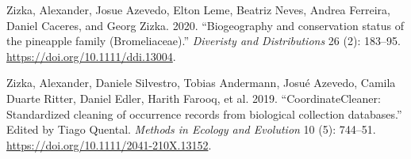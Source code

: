 \documentclass[fleqn,10pt,lineno]{wlpeerj} %
\begin{document}
\leavevmode\hypertarget{ref-Zizka2020b}{}%
Zizka, Alexander, Josue Azevedo, Elton Leme, Beatriz Neves, Andrea Ferreira, Daniel Caceres, and Georg Zizka. 2020. ``Biogeography and conservation status of the pineapple family (Bromeliaceae).'' \emph{Diveristy and Distributions} 26 (2): 183--95. \url{https://doi.org/10.1111/ddi.13004}.

\leavevmode\hypertarget{ref-Zizka2019}{}%
Zizka, Alexander, Daniele Silvestro, Tobias Andermann, Josué Azevedo, Camila Duarte Ritter, Daniel Edler, Harith Farooq, et al. 2019. ``CoordinateCleaner: Standardized cleaning of occurrence records from biological collection databases.'' Edited by Tiago Quental. \emph{Methods in Ecology and Evolution} 10 (5): 744--51. \url{https://doi.org/10.1111/2041-210X.13152}.
\end{document}
